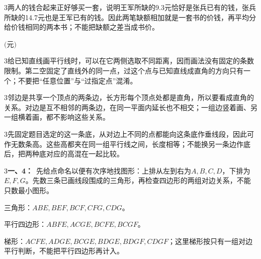 \documentclass[multi=snippet,border={5bp 20bp 5bp 5bp}]{standalone}
\newenvironment{snippet}[3]{\begin{minipage}{#1bp}\color{answerred}\fontsize{#2}{#3}\selectfont\raggedright}{\end{minipage}}
\begin{document}
\begin{snippet}{505}{11.5}{14}\begin{multicols}{3}\raggedcolumns 两人的钱合起来正好够买一套，说明王军所缺的9.3元恰好是张兵已有的钱，张兵所缺的14.7元也是王军已有的钱。因此两笔缺额相加就是一套书的价钱，再平均分给价钱相同的两本书；不能把缺额之差当成书价。\end{multicols}\end{snippet}
\begin{snippet}{80}{9.0}{14}\SourceSans\setlength{\mathindent}{2bp}\(\text{(元)}\)\end{snippet}
\begin{snippet}{505}{11.5}{14}\begin{multicols}{3}\raggedcolumns 给已知直线画平行线时，可以在它两侧选取不同距离，因而画法没有固定的条数限制。第二空固定了直线外的同一点，过这个点与已知直线成直角的方向只有一个；不要把“任意位置”与“过指定点”混淆。\end{multicols}\end{snippet}
\begin{snippet}{505}{11.5}{14}\begin{multicols}{3}\raggedcolumns 邻边是共享一个顶点的两条边，长方形每个顶点处都是直角，所以要看成直角的关系。对边是互不相邻的两条边，在同一平面内延长也不相交；一组边竖着画、另一组横着画，都不影响这些关系。\end{multicols}\end{snippet}
\begin{snippet}{505}{11.5}{14}\begin{multicols}{3}\raggedcolumns 先固定题目选定的这一条底，从对边上不同的点都能向这条底作垂线段，因此可作无数条高。这些高都夹在同一组平行线之间，长度相等；不能换另一条边作底后，把两种底对应的高混在一起比较。\end{multicols}\end{snippet}
\begin{snippet}{505}{11.5}{14}\begin{multicols}{3}\raggedcolumns \textbf{一、4：}\ 先给点命名以便有次序地找图形：上排从左到右为\(A,\allowbreak B,\allowbreak C,\allowbreak D\)\allowbreak ，下排为\(E,\allowbreak F,\allowbreak G\)\allowbreak 。先数三条已画线段围成的三角形，再检查四边形的两组对边关系，不能只数最小图形。\par 三角形：\(ABE,\allowbreak BEF,\allowbreak BCF,\allowbreak CFG,\allowbreak CDG\)\allowbreak 。\par 平行四边形：\(ABFE,\allowbreak ACGE,\allowbreak BCFE,\allowbreak BCGF\)\allowbreak 。\par 梯形：\(ACFE,\allowbreak ADGE,\allowbreak BCGE,\allowbreak BDGE,\allowbreak BDGF,\allowbreak CDGF\)\allowbreak ；这里梯形按只有一组对边平行判断，不能把平行四边形再计入。\end{multicols}\end{snippet}
\end{document}
